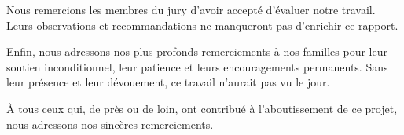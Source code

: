 \vspace{0.5cm}

Nous remercions les membres du jury d'avoir accept\'{e} d'\'{e}valuer notre
travail. Leurs observations et recommandations ne manqueront pas d'enrichir
ce rapport.

\vspace{0.5cm}

Enfin, nous adressons nos plus profonds remerciements \`{a} nos familles
pour leur soutien inconditionnel, leur patience et leurs encouragements
permanents. Sans leur pr\'{e}sence et leur d\'{e}vouement, ce travail n'aurait
pas vu le jour.

\vspace{0.5cm}

\`{A} tous ceux qui, de pr\`{e}s ou de loin, ont contribu\'{e} \`{a} l'aboutissement de
ce projet, nous adressons nos sinc\`{e}res remerciements.

\newpage
